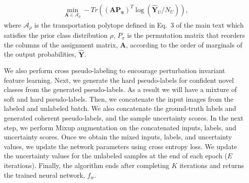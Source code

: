 \documentclass[runningheads]{eccv2022submission}
\begin{document}
\begin{align}
\label{eqn:minimize}
    \min_{\mathbf{A}\in\mathcal{A}_\rho}-Tr((\mathbf{A}\mathbf{P_\pi})^T\log(\mathbf{\hat{Y}}_U/N_U)),
\end{align}
where $\mathcal{A}_\rho$ is the transportation polytope defined in Eq.~3 of the main text which satisfies the prior class distribution $\rho$, $P_{\pi}$ is the permutation matrix that reorders the columns of the assignment matrix, $\mathbf{A}$, according to the order of marginals of the output probabilities, $\mathbf{\hat{Y}}$.


We also perform cross pseudo-labeling to encourage perturbation invariant feature learning. Next, we generate the hard pseudo-labels for confident novel classes from the generated pseudo-labels. As a result we will have a mixture of soft and hard pseudo-labels. Then, we concatenate the input images from the labeled and unlabeled batch. We also concatenate the ground-truth labels and generated coherent pseudo-labels, and the sample uncertainty scores. In the next step, we  perform Mixup augmentation\cite{zhang2018mixup} on the concatenated inputs, labels, and uncertainty scores. Once we obtain the mixed inputs, labels, and uncertainty values, we update the network parameters using cross entropy loss. We update the uncertainty values for the unlabeled samples at the end of each epoch ($E$ iterations). Finally, the algorithm ends after completing $K$ iterations and returns the trained neural network, $f_w$.       
\end{document}
